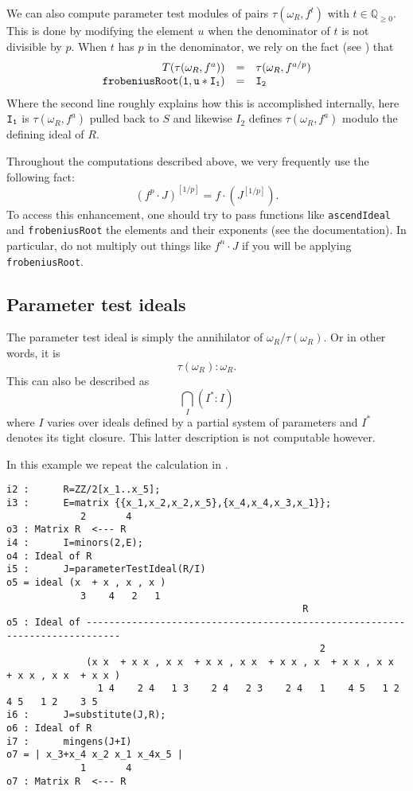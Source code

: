 \documentclass[11pt]{amsart}
\begin{document}
We can also compute parameter test modules of pairs $\tau(\omega_R, f^{t})$ with $t \in \mathbb{Q}_{\geq 0}$.  This is done by modifying the element $u$ when the denominator of $t$ is not divisible by $p$.  When $t$ has $p$ in the denominator, we rely on the fact (see \cite{}) that
\[
\begin{array}{rcl}
T(\tau(\omega_R, f^a)) & = & \tau(\omega_R, f^{a/p})\\
{\tt frobeniusRoot(1, u*I_1)} & {\tt =} & {\tt I_2}
\end{array}
\]
Where the second line roughly explains how this is accomplished internally, here ${\tt I_1}$ is $\tau(\omega_R, f^a)$ pulled back to $S$ and likewise $I_2$ defines $\tau(\omega_R, f^a)$ modulo the defining ideal of $R$.

\begin{remark}
Throughout the computations described above, we very frequently use the following fact:
\[
(f^p \cdot J)^{[1/p]} = f \cdot (J^{[1/p]}).
\]
To access this enhancement, one should try to pass functions like {\tt ascendIdeal} and {\tt frobeniusRoot} the elements and their exponents (see the documentation).  In particular, do not multiply out things like $f^n \cdot J$ if you will be applying {\tt frobeniusRoot}.
\end{remark}

\subsection{Parameter test ideals}

The parameter test ideal is simply the annihilator of $\omega_R/\tau(\omega_R)$.  Or in other words, it is
\[
\tau(\omega_R) : \omega_R.
\]
This can also be described as
\[
\bigcap_{I} (I^* : I)
\]
where $I$ varies over ideals defined by a partial system of parameters and $I^*$ denotes its tight closure.  This latter description is not computable however.

\begin{example}\label{Example: parameter test ideal}
In this example we repeat the calculation in \cite[\S 9]{KatzmanParameterTestIdealOfCMRings}.

\begin{verbatim}
i2 :      R=ZZ/2[x_1..x_5];
i3 :      E=matrix {{x_1,x_2,x_2,x_5},{x_4,x_4,x_3,x_1}};
             2       4
o3 : Matrix R  <--- R
i4 :      I=minors(2,E);
o4 : Ideal of R
i5 :      J=parameterTestIdeal(R/I)
o5 = ideal (x  + x , x , x )
             3    4   2   1
                                                    R
o5 : Ideal of ----------------------------------------------------------------------------
                                                       2
              (x x  + x x , x x  + x x , x x  + x x , x  + x x , x x  + x x , x x  + x x )
                1 4    2 4   1 3    2 4   2 3    2 4   1    4 5   1 2    4 5   1 2    3 5
i6 :      J=substitute(J,R);
o6 : Ideal of R
i7 :      mingens(J+I)
o7 = | x_3+x_4 x_2 x_1 x_4x_5 |
             1       4
o7 : Matrix R  <--- R
\end{verbatim}

\end{example}
\end{document}
